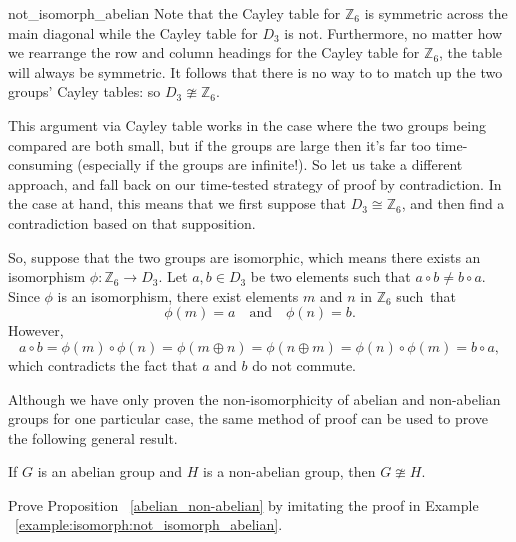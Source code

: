 \begin{example}{not_isomorph_abelian}
Note that the Cayley table for ${\mathbb Z}_6$ is symmetric across the main diagonal while the Cayley table for $D_3$ is not.  Furthermore, no matter how we rearrange the row and column headings for the Cayley table for ${\mathbb Z}_6$, the  table will always be symmetric. It follows that there is no way to to match up the two groups' Cayley tables: so $D_3 \ncong {\mathbb Z}_6$.

This  argument via Cayley table works in the case where the two groups being compared are both small, but if the groups are large then it's far too time-consuming (especially if the groups are infinite!). So let us take a different approach, and fall back on our time-tested strategy of proof by contradiction. In the case at hand, this means that we first suppose that $D_3 \cong {\mathbb Z}_6$, and  then find a contradiction based on that supposition. 

So, suppose that the two groups are isomorphic, which means there exists an isomorphism $\phi : {\mathbb Z}_6 \rightarrow  D_3$.  Let $a , b \in D_3$ be two elements such that $a\circ b \neq b \circ a$.  Since $\phi$ is an isomorphism, there exist elements $m$ and $n$ in ${\mathbb Z}_6$ such~that 
\[
\phi( m )  = a \quad \text{and} \quad
\phi( n )  = b.
\]
However,
\[
a\circ b = \phi(m ) \circ  \phi(n) = \phi(m \oplus  n) = \phi(n \oplus m) = \phi(n ) \circ \phi(m) = b \circ a,
\]
which contradicts the fact that $a$ and $b$ do not commute.
\end{example}

Although we have only proven the non-isomorphicity of abelian and non-abelian groups for one particular case, the same  method of proof can be used to prove the following general result.

\begin{thm}\label{abelian_non-abelian}
If $G$ is an abelian group and $H$ is a non-abelian group, then $G \ncong H$.
\end{thm}

\begin{exercise}{}
Prove Proposition ~\ref{abelian_non-abelian} by imitating the proof in Example ~\ref{example:isomorph:not_isomorph_abelian}.
\end{exercise}


